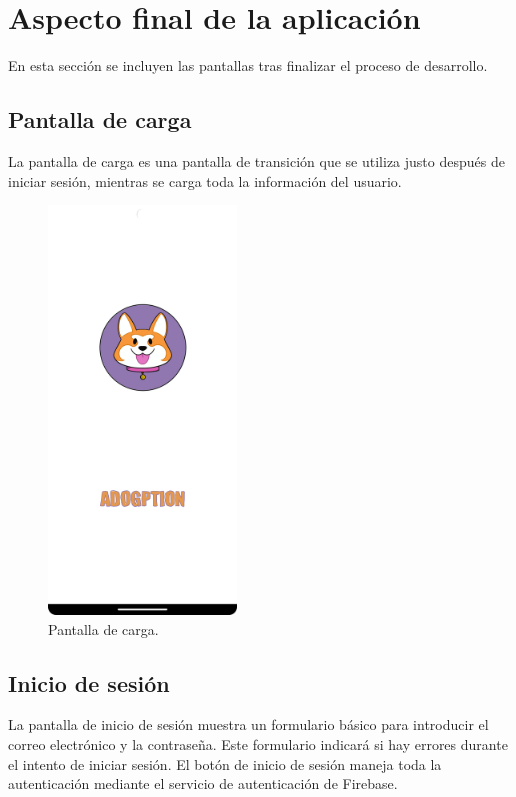 \documentclass[a4paper, 12pt]{article}
\begin{document}
\newpage
\section{Aspecto final de la aplicación}

En esta sección se incluyen las pantallas tras finalizar el proceso de desarrollo.

\subsection*{Pantalla de carga}

La pantalla de carga es una pantalla de transición que se utiliza justo después de iniciar sesión, mientras se carga toda la información del usuario.

\begin{figure}[H]
	\begin{center}
		{\includegraphics[width=5cm]{app/Splashscreen.png}\par}
		\caption{Pantalla de carga.}
	\end{center}
\end{figure}


\newpage
\subsection*{Inicio de sesión}

La pantalla de inicio de sesión muestra un formulario básico para introducir el correo electrónico y la contraseña. Este formulario indicará si hay errores durante el intento de iniciar sesión. El botón de inicio de sesión maneja toda la autenticación mediante el servicio de autenticación de Firebase.
\end{document}
